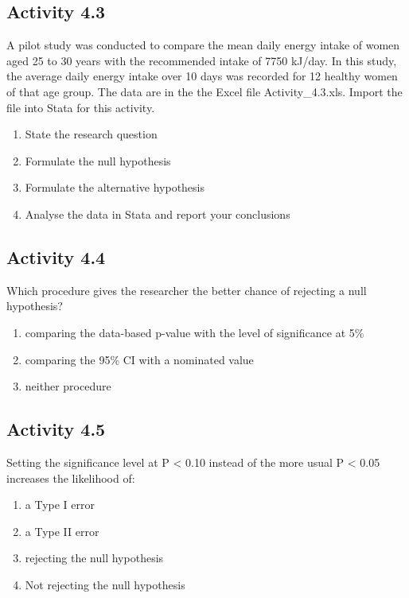 \documentclass[
]{memoir}
\providecommand{\tightlist}{%
  \setlength{\itemsep}{0pt}\setlength{\parskip}{0pt}}
\begin{document}
\hypertarget{activity-4.3}{%
\subsection{Activity 4.3}\label{activity-4.3}}

A pilot study was conducted to compare the mean daily energy intake of women aged 25 to 30 years with the recommended intake of 7750 kJ/day. In this study, the average daily energy intake over 10 days was recorded for 12 healthy women of that age group. The data are in the the Excel file Activity\_4.3.xls. Import the file into Stata for this activity.

\begin{enumerate}
\def\labelenumi{\alph{enumi})}
\tightlist
\item
  State the research question
\item
  Formulate the null hypothesis
\item
  Formulate the alternative hypothesis
\item
  Analyse the data in Stata and report your conclusions
\end{enumerate}

\hypertarget{activity-4.4}{%
\subsection{Activity 4.4}\label{activity-4.4}}

Which procedure gives the researcher the better chance of rejecting a null hypothesis?

\begin{enumerate}
\def\labelenumi{\alph{enumi})}
\tightlist
\item
  comparing the data-based p-value with the level of significance at 5\%
\item
  comparing the 95\% CI with a nominated value
\item
  neither procedure
\end{enumerate}

\hypertarget{activity-4.5}{%
\subsection{Activity 4.5}\label{activity-4.5}}

Setting the significance level at P \textless{} 0.10 instead of the more usual P \textless{} 0.05 increases the likelihood of:

\begin{enumerate}
\def\labelenumi{\alph{enumi})}
\tightlist
\item
  a Type I error
\item
  a Type II error
\item
  rejecting the null hypothesis
\item
  Not rejecting the null hypothesis
\end{enumerate}
\end{document}
